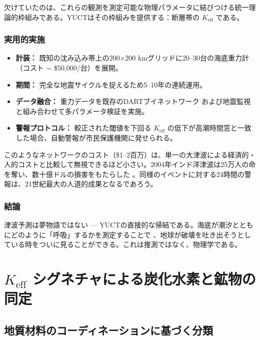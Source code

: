 \documentclass[12pt,a4paper]{article}
\theoremstyle{remark}
\newcommand{\Keff}{K_{\mathrm{eff}}}
\begin{document}
	欠けていたのは、これらの観測を測定可能な物理パラメータに結びつける統一理論的枠組みである。YUCTはその枠組みを提供する：断層帯の \(K_{\mathrm{eff}}\) である。
	
	\subsubsection{実用的実施}
	
	\begin{itemize}
		\item \textbf{計装：} 既知の沈み込み帯上の200×200 kmグリッドに20–30台の海底重力計（コスト \(\sim\) \$50,000/台）を展開。
		\item \textbf{期間：} 完全な地震サイクルを捉えるため5–10年の連続運用。
		\item \textbf{データ融合：} 重力データを既存のDARTブイネットワーク \cite{NOAA2024} および地震監視 \cite{USGS2024} と組み合わせて多パラメータ検証を実施。
		\item \textbf{警報プロトコル：} 較正された閾値を下回る \(K_{\mathrm{eff}}\) の低下が高潮時間窓と一致した場合、自動警報が市民保護機関に発せられる。
	\end{itemize}
	
	このようなネットワークのコスト（\$1–2百万）は、単一の大津波による経済的・人的コストと比較して無視できるほど小さい。2004年インド洋津波は25万人の命を奪い、数十億ドルの損害をもたらした \cite{NOAA2024, USGS2024}。同様のイベントに対する24時間の警報は、21世紀最大の人道的成果となるであろう。
	
	\subsubsection{結論}
	
	津波予測は夢物語ではない — YUCTの直接的な帰結である。海底が潮汐とともにどのように「呼吸」するかを測定することで \cite{Tolstoy2013}、地球が破壊を吐き出そうとしている時をついに見ることができる。これは推測ではなく、物理学である。
	
	\section{\(\Keff\) シグネチャによる炭化水素と鉱物の同定}
	\label{sec:identification}
	
	\subsection{地質材料のコーディネーションに基づく分類}
	
\end{document}
